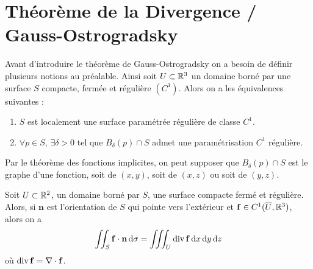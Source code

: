 
\section{Théorème de la Divergence / Gauss-Ostrogradsky}
Avant d'introduire le théorème de Gauss-Ostrogradsky on a besoin de définir plusieurs notions au préalable. Ainsi soit $U \subset \mathbb{R}^3$ un domaine borné par une surface $S$ compacte, fermée et régulière $(C^1)$. Alors on a les équivalences suivantes : 
\begin{enumerate}
	\item[$\iff$] $S$ est localement une surface paramétrée régulière de classe $C^1$.
	\item[$\iff$] $\forall p \in S, \, \exists \delta > 0$ tel que $B_\delta (p) \cap S$ admet une paramétrisation $C^1$ régulière.
\end{enumerate}
Par le théorème des fonctions implicites, on peut supposer que $B_\delta (p) \cap S$ est le graphe d'une fonction, soit de $(x,y)$, soit de $(x,z)$ ou soit de $(y,z)$.

\begin{theoreme} \label{thm: Gauss-Ostrogradsky}
	Soit $U \subset \mathbb{R}^2$, un domaine borné par $S$, une surface compacte fermé et régulière. Alors, si $\bm n$ est l'orientation de $S$ qui pointe vers l'extérieur et $\mathbf{f} \in C^1(\overline U, \mathbb{R}^3)$, alors on a 
	\[
	\iint_S \mathbf{f} \cdot \mathbf{n} \, \mathrm d \sigma = \iiint_U \operatorname{div} \mathbf{f} \, \mathrm dx \, \mathrm dy \, \mathrm dz
	\]
	où $\operatorname{div} \mathbf{f} = \nabla \cdot \mathbf{f}$.
\end{theoreme}

